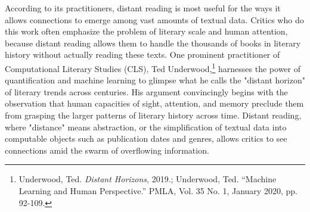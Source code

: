 \documentclass[11pt]{article}
\begin{document}
According to its practitioners, distant reading is most useful for the
ways it allows connections to emerge among vast amounts of textual
data. Critics who do this work often emphasize the problem of literary
scale and human attention, because distant reading allows them to
handle the thousands of books in literary history without actually
reading these texts. One prominent practitioner of Computational
Literary Studies (CLS), Ted Underwood,\footnote{Underwood, Ted. \emph{Distant Horizons}, 2019.; Underwood,
Ted. “Machine Learning and Human Perspective.” PMLA, Vol. 35 No. 1,
January 2020, pp. 92-109.} harnesses the power of
quantification and machine learning to glimpse what he calls the
"distant horizon" of literary trends across centuries. His argument
convincingly begins with the observation that human capacities of
sight, attention, and memory preclude them from grasping the larger
patterns of literary history across time. Distant reading, where
"distance" means abstraction, or the simplification of textual data
into computable objects such as publication dates and genres, allows
critics to see connections amid the swarm of overflowing information.
\end{document}
